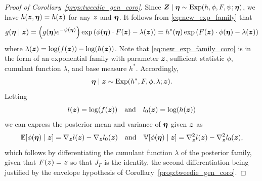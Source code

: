 \documentclass{article}
\theoremstyle{definition}
\begin{document}
\begin{proof}[Proof of Corollary~\ref{prop:tweedie_gen_coro}]
    Since $\boldsymbol{Z} \mid \boldsymbol{\eta} \sim \text{Exp}(h, \phi, F, \psi ; \boldsymbol{\eta})$, we have $h(\boldsymbol{z}, \boldsymbol{\eta}) = h(\boldsymbol{z})$ for any $\boldsymbol{z}$ and $\boldsymbol{\eta}$. It follows from \eqref{eq:new_exp_family} that
    \begin{align}
        g(\boldsymbol{\eta} \mid \boldsymbol{z}) = \left(g(\boldsymbol{\eta})e^{-\psi(\boldsymbol{\eta})}\right)\exp\left( \phi(\boldsymbol{\eta}) \cdot F(\boldsymbol{z}) - \lambda(\boldsymbol{z})\right) = h^*(\boldsymbol{\eta})\exp\left( F(\boldsymbol{z}) \cdot \phi(\boldsymbol{\eta}) - \lambda(\boldsymbol{z})\right) \label{eq:new_exp_family_coro}
    \end{align}
    where  $\lambda(\boldsymbol{z}) = \log(f(\boldsymbol{z})) - \log(h(\boldsymbol{z}))$. Note that \eqref{eq:new_exp_family_coro} is in the form of an exponential family with parameter $\boldsymbol{z}$, sufficient statistic $\phi$, cumulant function $\lambda$, and base measure $h^*$. Accordingly,
		\begin{align}
		\boldsymbol{\eta} \mid \boldsymbol{z} \sim \text{Exp}(h^*, F, \phi, \lambda ; \boldsymbol{z}). \notag
		\end{align}
		Letting
    \begin{equation*}
        l(\boldsymbol{z}) = \log(f(\boldsymbol{z})) \quad \text{and} \quad l_0(\boldsymbol{z}) = \log(h(\boldsymbol{z}))
    \end{equation*}
    we can express the posterior mean and variance of $\boldsymbol{\eta}$ given $\boldsymbol{z}$ as
    \begin{equation*}
        \mathbb{E}[\phi(\boldsymbol{\eta}) \mid \boldsymbol{z}] = \nabla_{\boldsymbol{z}} l(\boldsymbol{z}) - \nabla_{\boldsymbol{z}} l_0(\boldsymbol{z}) \quad \text{and} \quad \mathbb{V}[\phi(\boldsymbol{\eta}) \mid \boldsymbol{z}] = \nabla_{\boldsymbol{z}}^2 l(\boldsymbol{z}) - \nabla_{\boldsymbol{z}}^2 l_0(\boldsymbol{z}),
    \end{equation*}
		which follows by differentiating the cumulant function $\lambda$ of the posterior family, given that $F(\boldsymbol{z}) = \boldsymbol{z}$ so that $J_F$ is the identity, the second differentiation being justified by the envelope hypothesis of Corollary~\ref{prop:tweedie_gen_coro}.
\end{proof}



\end{document}

